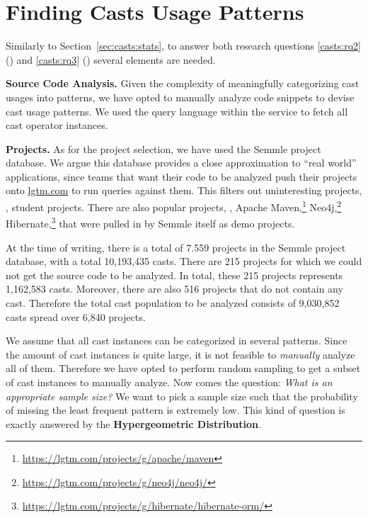 \section{Finding Casts Usage Patterns}
\label{sec:casts:methodology}

Similarly to Section~\ref{sec:casts:stats},
%
%
to answer both research questions \ref{casts:rq2} (\emph{\crqB}) and \ref{casts:rq3} (\emph{\crqC}) several elements are needed.

\textbf{Source Code Analysis.}
Given the complexity of meaningfully categorizing cast usages into patterns,
we have opted to manually analyze code snippets to devise cast usage patterns.
We used the \ql{} query language within the \lgtm{} service to fetch all cast operator instances.

\textbf{Projects.}
As for the project selection, we have used the Semmle project database.
We argue this database provides a close approximation to ``real world'' applications, since teams that want their code to be analyzed push their projects onto \href{https://lgtm.com}{lgtm.com} to run queries against them.
This filters out uninteresting projects, \eg, student projects.
There are also popular projects, \eg,
Apache Maven,\footnote{\url{https://lgtm.com/projects/g/apache/maven}}
Neo4j,\footnote{\url{https://lgtm.com/projects/g/neo4j/neo4j/}}
Hibernate,\footnote{\url{https://lgtm.com/projects/g/hibernate/hibernate-orm/}}
that were pulled in by Semmle itself as demo projects.


At the time of writing, there is a total of 7.559 projects in the Semmle project database, with a total 10,193,435 casts.
%
%
There are 215 projects for which we could not get the source code to be analyzed.
In total, these 215 projects represents 1,162,583 casts.
Moreover, there are also 516 projects that do not contain any cast.
Therefore the total cast population to be analyzed consists of 9,030,852 casts spread over 6,840 projects.

We assume that all cast instances can be categorized in several patterns.
Since the amount of cast instances is quite large, it is not feasible to \emph{manually} analyze all of them.
Therefore we have opted to perform random sampling to get a subset of cast instances to manually analyze.
Now comes the question: \emph{What is an appropriate sample size?}
We want to pick a sample size such that the probability of missing the least frequent pattern is extremely low.
This kind of question is exactly answered by the \textbf{Hypergeometric Distribution}.

